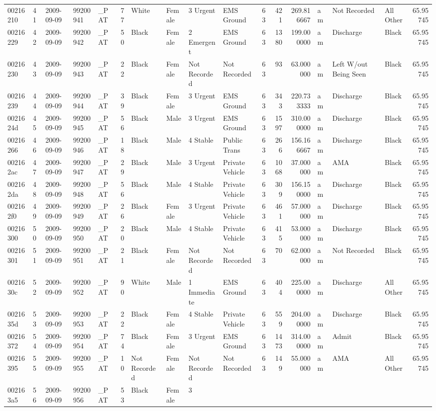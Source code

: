 \documentclass[]{elsarticle} %
\begin{document}
\begin{longtable}[]{@{}lllllrllllrrrlllr@{}}
00216210 & 41 & 2009-09-09 & 99200941 & \_PAT & 77 & White & Female & 3
Urgent & EMS Ground & 63 & 421 & 269.816667 & am & Not Recorded & All
Other & 65.95745\tabularnewline
00216229 & 42 & 2009-09-09 & 99200942 & \_PAT & 50 & Black & Female & 2
Emergent & EMS Ground & 63 & 1380 & 199.000000 & am & Discharge & Black
& 65.95745\tabularnewline
00216230 & 43 & 2009-09-09 & 99200943 & \_PAT & 22 & Black & Female &
Not Recorded & Not Recorded & 63 & 93 & 63.000000 & am & Left W/out
Being Seen & Black & 65.95745\tabularnewline
00216239 & 44 & 2009-09-09 & 99200944 & \_PAT & 39 & Black & Female & 3
Urgent & EMS Ground & 63 & 343 & 220.733333 & am & Discharge & Black &
65.95745\tabularnewline
0021624d & 45 & 2009-09-09 & 99200945 & \_PAT & 56 & Black & Male & 3
Urgent & EMS Ground & 63 & 1597 & 310.000000 & am & Discharge & Black &
65.95745\tabularnewline
00216266 & 46 & 2009-09-09 & 99200946 & \_PAT & 18 & Black & Male & 4
Stable & Public Trans & 63 & 266 & 156.166667 & am & Discharge & Black &
65.95745\tabularnewline
002162ac & 47 & 2009-09-09 & 99200947 & \_PAT & 29 & Black & Male & 3
Urgent & Private Vehicle & 63 & 1068 & 37.000000 & am & AMA & Black &
65.95745\tabularnewline
002162da & 48 & 2009-09-09 & 99200948 & \_PAT & 56 & Black & Male & 4
Stable & Private Vehicle & 63 & 309 & 156.150000 & am & Discharge &
Black & 65.95745\tabularnewline
002162f0 & 49 & 2009-09-09 & 99200949 & \_PAT & 26 & Black & Female & 3
Urgent & Private Vehicle & 63 & 461 & 57.000000 & am & Discharge & Black
& 65.95745\tabularnewline
00216300 & 50 & 2009-09-09 & 99200950 & \_PAT & 20 & Black & Male & 4
Stable & Private Vehicle & 63 & 415 & 53.000000 & am & Discharge & Black
& 65.95745\tabularnewline
00216301 & 51 & 2009-09-09 & 99200951 & \_PAT & 21 & Black & Female &
Not Recorded & Not Recorded & 63 & 70 & 62.000000 & am & Not Recorded &
Black & 65.95745\tabularnewline
0021630c & 52 & 2009-09-09 & 99200952 & \_PAT & 90 & White & Male & 1
Immediate & EMS Ground & 63 & 404 & 225.000000 & am & Discharge & All
Other & 65.95745\tabularnewline
0021635d & 53 & 2009-09-09 & 99200953 & \_PAT & 22 & Black & Female & 4
Stable & Private Vehicle & 63 & 559 & 204.000000 & am & Discharge &
Black & 65.95745\tabularnewline
00216372 & 54 & 2009-09-09 & 99200954 & \_PAT & 74 & Black & Female & 3
Urgent & EMS Ground & 63 & 1473 & 314.000000 & am & Admit & Black &
65.95745\tabularnewline
00216395 & 55 & 2009-09-09 & 99200955 & \_PAT & 10 & Not Recorded &
Female & Not Recorded & Not Recorded & 63 & 149 & 55.000000 & am & AMA &
All Other & 65.95745\tabularnewline
002163a5 & 56 & 2009-09-09 & 99200956 & \_PAT & 53 & Black & Female & 3

\end{longtable}
\end{document}
